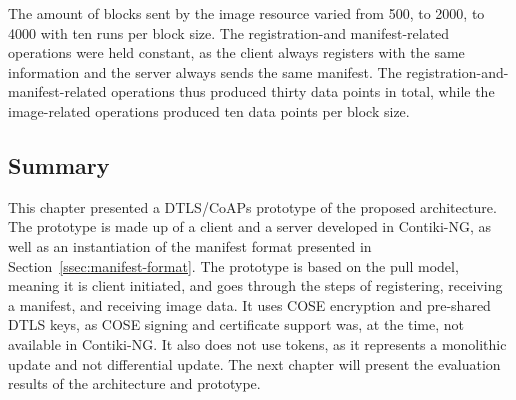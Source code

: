 \documentclass[0-thesis.tex]{subfiles}
\begin{document}
The amount of blocks sent by the image resource varied from 500, to 2000, to 4000 with ten
runs per block size. The registration-and manifest-related operations were held constant,
as the client always registers with the same information and the server always sends the
same manifest. The registration-and-manifest-related operations thus produced thirty data
points in total, while the image-related operations produced ten data points per block
size.

\subsection{Summary}
\label{ssec:implementation-summary}
This chapter presented a DTLS/CoAPs prototype of the proposed architecture. The prototype
is made up of a client and a server developed in Contiki-NG, as well as an instantiation
of the manifest format presented in Section~\ref{ssec:manifest-format}. The prototype is
based on the pull model, meaning it is client initiated, and goes through the steps of
registering, receiving a manifest, and receiving image data. It uses COSE encryption and
pre-shared DTLS keys, as COSE signing and certificate support was, at the time, not
available in Contiki-NG. It also does not use tokens, as it represents a monolithic update
and not differential update. The next chapter will present the evaluation results of the
architecture and prototype.
\end{document}
